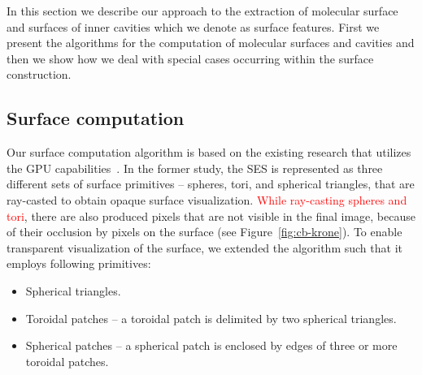 In this section we describe our approach to the extraction of molecular surface and surfaces of inner cavities which we denote as surface features.
First we present the algorithms for the computation of molecular surfaces and cavities and then we show how we deal with special cases occurring within the surface construction.

\subsection{Surface computation}
\label{sec:ecb}
Our surface computation algorithm is based on the existing research that utilizes the GPU capabilities~\cite{krone2011parallel}.
In the former study, the SES is represented as three different sets of surface primitives -- spheres, tori, and spherical triangles, that are ray-casted to obtain opaque surface visualization. 
\textcolor{red}{While ray-casting spheres and tori}, there are also produced pixels that are not visible in the final image, because of their occlusion by pixels on the surface (see Figure~\ref{fig:cb-krone}).
To enable transparent visualization of the surface, we extended the algorithm such that it employs following primitives:
\begin{itemize}
	\item Spherical triangles.
  \item Toroidal patches -- a toroidal patch is delimited by two spherical triangles.
	\item Spherical patches -- a spherical patch is enclosed by edges of three or more toroidal patches.
\end{itemize}

